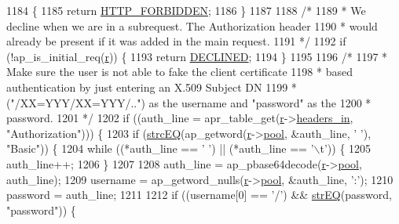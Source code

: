 \begin{DoxyCode}
1184     \{
1185         \textcolor{keywordflow}{return} \hyperlink{group__HTTP__Status_ga92646f876056a1e5013e0050496dc04d}{HTTP\_FORBIDDEN};
1186     \}
1187 
1188     \textcolor{comment}{/*}
1189 \textcolor{comment}{     * We decline when we are in a subrequest.  The Authorization header}
1190 \textcolor{comment}{     * would already be present if it was added in the main request.}
1191 \textcolor{comment}{     */}
1192     \textcolor{keywordflow}{if} (!ap\_is\_initial\_req(\hyperlink{group__APACHE__CORE__CONFIG_ga091cdd45984e865a888a4f8bb8fe107a}{r})) \{
1193         \textcolor{keywordflow}{return} \hyperlink{group__APACHE__CORE__DAEMON_ga9eba11ca86461a3ae319311d64682dda}{DECLINED};
1194     \}
1195 
1196     \textcolor{comment}{/*}
1197 \textcolor{comment}{     * Make sure the user is not able to fake the client certificate}
1198 \textcolor{comment}{     * based authentication by just entering an X.509 Subject DN}
1199 \textcolor{comment}{     * ("/XX=YYY/XX=YYY/..") as the username and "password" as the}
1200 \textcolor{comment}{     * password.}
1201 \textcolor{comment}{     */}
1202     \textcolor{keywordflow}{if} ((auth\_line = apr\_table\_get(\hyperlink{group__APACHE__CORE__CONFIG_ga091cdd45984e865a888a4f8bb8fe107a}{r}->\hyperlink{structrequest__rec_a5497da6c01af49acf70a4a9b975c1c83}{headers\_in}, \textcolor{stringliteral}{"Authorization"}))) \{
1203         \textcolor{keywordflow}{if} (\hyperlink{mod__nw__ssl_8c_a8c9b1bea39b1e4f8b9ecad58e16b6e71}{strcEQ}(ap\_getword(\hyperlink{group__APACHE__CORE__CONFIG_ga091cdd45984e865a888a4f8bb8fe107a}{r}->\hyperlink{structrequest__rec_aa0a0c16f9a9ab3901cdb3f3c9c9d83d0}{pool}, &auth\_line, \textcolor{charliteral}{' '}), \textcolor{stringliteral}{"Basic"})) \{
1204             \textcolor{keywordflow}{while} ((*auth\_line == \textcolor{charliteral}{' '}) || (*auth\_line == \textcolor{charliteral}{'\(\backslash\)t'})) \{
1205                 auth\_line++;
1206             \}
1207 
1208             auth\_line = ap\_pbase64decode(\hyperlink{group__APACHE__CORE__CONFIG_ga091cdd45984e865a888a4f8bb8fe107a}{r}->\hyperlink{structrequest__rec_aa0a0c16f9a9ab3901cdb3f3c9c9d83d0}{pool}, auth\_line);
1209             username = ap\_getword\_nulls(\hyperlink{group__APACHE__CORE__CONFIG_ga091cdd45984e865a888a4f8bb8fe107a}{r}->\hyperlink{structrequest__rec_aa0a0c16f9a9ab3901cdb3f3c9c9d83d0}{pool}, &auth\_line, \textcolor{charliteral}{':'});
1210             password = auth\_line;
1211 
1212             \textcolor{keywordflow}{if} ((username[0] == \textcolor{charliteral}{'/'}) && \hyperlink{mod__nw__ssl_8c_a28f07278031630624caac61cb2c75656}{strEQ}(password, \textcolor{stringliteral}{"password"})) \{

\end{DoxyCode}
